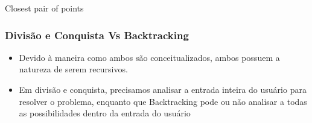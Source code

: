     \begin{algorithm}
        \caption{Closest pair of points} 
        \begin{algorithmic}[1]
        \EndIf
        \EndIf
        \EndIf
        \EndFor
        \EndProcedure
        \end{algorithmic}
      \end{algorithm}

      \subsubsection{Divisão e Conquista Vs Backtracking}

      \begin{itemize}
          \item Devido à maneira como ambos são conceitualizados, ambos possuem a 
          natureza de serem recursivos.
          \item Em divisão e conquista, precisamos analisar a entrada inteira do usuário 
          para resolver o problema, enquanto que Backtracking pode ou não analisar a todas 
          as possibilidades dentro da entrada do usuário
      \end{itemize}

